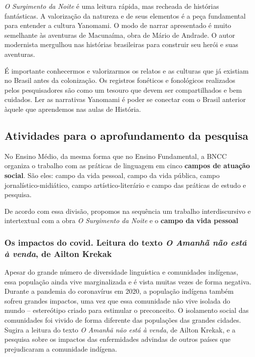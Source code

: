 \documentclass[12pt]{extarticle}
\begin{document}
{\emph{O Surgimento da Noite} é uma leitura rápida, mas recheada de
histórias fantásticas. A valorização da natureza e de seus elementos é a
peça fundamental para entender a cultura Yanomami. O modo de narrar
apresentado é muito semelhante às aventuras de Macunaíma, obra de Mário
de Andrade. O autor modernista mergulhou nas histórias brasileiras para
construir seu herói e suas aventuras.

É importante conhecermos e valorizarmos os relatos e as culturas que já
existiam no Brasil antes da colonização. Os registros fonéticos e
fonológicos realizados pelos pesquisadores são como um tesouro que devem
ser compartilhados e bem cuidados. Ler as narrativas Yanomami é poder
se conectar com o Brasil anterior àquele que aprendemos nas aulas de
História.


\subsection{Atividades para o aprofundamento da pesquisa}

No Ensino Médio, da mesma forma que no Ensino Fundamental, a BNCC
organiza o trabalho com as práticas de linguagem em cinco \textbf{campos
de atuação social}. São eles: campo da vida pessoal, campo da vida
pública, campo jornalístico-midiático, campo artístico-literário e campo
das práticas de estudo e pesquisa.

De acordo com essa divisão, propomos na sequência um trabalho
interdiscursivo e intertextual com a obra \emph{O Surgimento da Noite} e o \textbf{campo da vida pessoal}

\subsubsection{Os impactos do covid. Leitura do texto \emph{O Amanhã não está à venda}, de Ailton Krekak}


  Apesar do grande número de diversidade linguística e comunidades
  indígenas, essa população ainda vive marginalizada e é vista muitas
  vezes de forma negativa. Durante a pandemia do coronavírus em 2020, a
  população indígena também sofreu grandes impactos, uma vez que essa
  comunidade não vive isolada do mundo -- estereótipo criado para
  estimular o preconceito. O isolamento social das comunidades foi
  vivido de forma diferente das populações das grandes cidades. Sugira a
  leitura do texto \emph{O Amanhã não está à venda}, de Ailton Krekak, e a
  pesquisa sobre os impactos das enfermidades advindas de outros países
  que prejudicaram a comunidade indígena.

}
\end{document}
